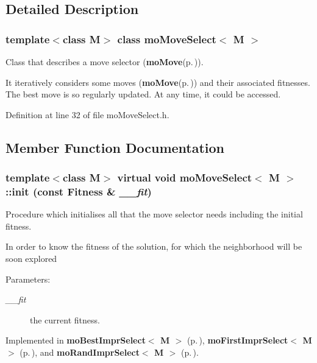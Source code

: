 \subsection{Detailed Description}
\subsubsection*{template$<$class M$>$ class mo\-Move\-Select$<$ M $>$}

Class that describes a move selector ({\bf mo\-Move}{\rm (p.\,\pageref{classmo_move})}). 

It iteratively considers some moves ({\bf mo\-Move}{\rm (p.\,\pageref{classmo_move})}) and their associated fitnesses. The best move is so regularly updated. At any time, it could be accessed. 



Definition at line 32 of file mo\-Move\-Select.h.

\subsection{Member Function Documentation}
\subsubsection{\setlength{\rightskip}{0pt plus 5cm}template$<$class M$>$ virtual void {\bf mo\-Move\-Select}$<$ M $>$::init (const {\bf Fitness} \& {\em \_\-\_\-fit})\hspace{0.3cm}{\tt  [pure virtual]}}\label{classmo_move_select_bca4c43f13d26eca7163aeb272a4a52e}


Procedure which initialises all that the move selector needs including the initial fitness. 

In order to know the fitness of the solution, for which the neighborhood will be soon explored

\begin{Desc}
\item[Parameters:]
\begin{description}
\item[{\em \_\-\_\-fit}]the current fitness. \end{description}
\end{Desc}


Implemented in {\bf mo\-Best\-Impr\-Select$<$ M $>$} {\rm (p.\,\pageref{classmo_best_impr_select_2d2abf9aa17dc77cbb4f41810ab7b956})}, {\bf mo\-First\-Impr\-Select$<$ M $>$} {\rm (p.\,\pageref{classmo_first_impr_select_4c5ce18ede46247a439c68f6954a4055})}, and {\bf mo\-Rand\-Impr\-Select$<$ M $>$} {\rm (p.\,\pageref{classmo_rand_impr_select_a19726a1509cff874801615d63a3b5d9})}.
